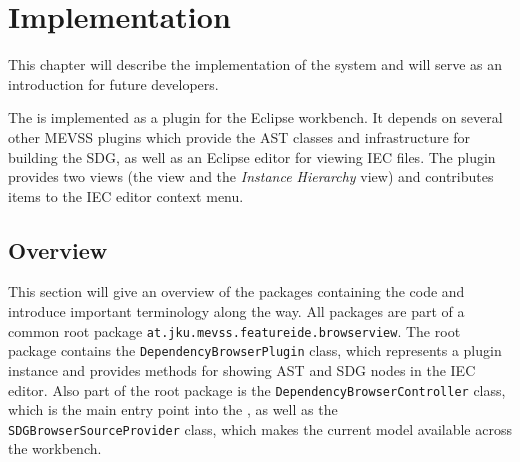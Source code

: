 \chapter{Implementation} \label{ch:impl}

This chapter will describe the implementation of the system and will serve as an introduction for future developers.

The \SB is implemented as a plugin for the Eclipse workbench. It depends on several other MEVSS plugins which provide 
the AST classes and infrastructure for building the SDG, as well as an Eclipse editor for viewing IEC files. The \SB 
plugin provides two views (the \emph{\SB} view and the \emph{Instance Hierarchy} view) and contributes items to the IEC 
editor context menu.


\section{Overview}

This section will give an overview of the packages containing the \SB code and introduce important terminology along 
the way. All packages are part of a common root package \lstinline|at.jku.mevss.featureide.browserview|. The root 
package contains the \lstinline|DependencyBrowserPlugin| class, which represents a plugin instance and provides methods 
for showing AST and SDG nodes in the IEC editor. Also part of the root package is the 
\lstinline|DependencyBrowserController| class, which is the main entry point into the \SB, as well as the 
\lstinline|SDGBrowserSourceProvider| class, which makes the current model available across the workbench.

